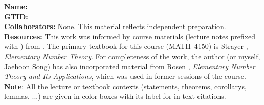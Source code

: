 
{\large
  \noindent
  \textbf{Name:} \HandoutAuthor \smallskip \\

  \noindent
  \textbf{GTID:} \HandoutAuthorID \smallskip \\

  \noindent
  \textbf{Collaborators:} None. This material reflects independent preparation. \smallskip \\

  \noindent
  \textbf{Resources:} This work was informed by course materials 
  (lecture notes prefixed with )
  from \HandoutInstitution. The primary textbook for this course (MATH~4150) is 
  Strayer \parencite{strayer_element_2001}, \textit{Elementary Number Theory}. 
  For completeness of the work, the author (or myself, Jaehoon Song) has also incorporated material from 
  Rosen \parencite{rosen_elementary_2005}, \textit{Elementary Number Theory and Its Applications}, 
  which was used in former sessions of the course. \smallskip \\
  \textbf{Note}: All the lecture or textbook contexts (statements, theorems, corollarys, lemmas, ...) 
  are given in color boxes with its label for in-text citations. 
}